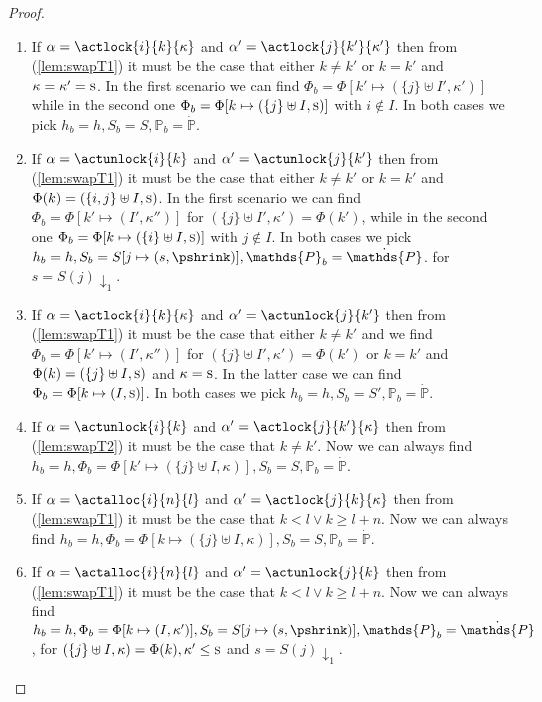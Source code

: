 \begin{lem}
\begin{proof}
\begin{enumerate}[label=({\roman*})]
		\item If $\alpha = \actlock{i}{k}{\kappa}$ and $\alpha' = \actlock{j}{k'}{\kappa'}$ then from (\ref{lem:swapT1}) it must be the case that either $k \neq k'$ or $k = k'$ and $\kappa = \kappa' = \textsc{s}$. In the first scenario we can find $\Phi_b = \Phi[k' \mapsto (\{j\} \uplus I', \kappa')]$ while in the second one $\Phi_b = \Phi[k \mapsto (\{j\} \uplus I, \textsc{s})]$ with $i \not\in I$. In both cases we pick $h_b = h, S_b = S, \mathds{P}_b = \dot{\mathds{P}}$.
		
		\item If $\alpha = \actunlock{i}{k}$ and $\alpha' = \actunlock{j}{k'}$ then from (\ref{lem:swapT1}) it must be the case that either $k \neq k'$ or $k = k'$ and $\Phi(k) = (\{i, j\} \uplus I, \textsc{s})$. In the first scenario we can find $\Phi_b = \Phi[k' \mapsto (I', \kappa'')]$ for $(\{j\} \uplus I', \kappa') = \Phi(k')$, while in the second one $\Phi_b = \Phi[k \mapsto (\{i\} \uplus I, \textsc{s})]$ with $j \not\in I$. In both cases we pick $h_b = h, S_b = S[j \mapsto (s, \pshrink)], \mathds{P}_b = \dot{\mathds{P}}$. for $s = S(j) \downarrow_1$.
		
		\item If $\alpha = \actlock{i}{k}{\kappa}$ and $\alpha' = \actunlock{j}{k'}$ then from (\ref{lem:swapT1}) it must be the case that either $k \neq k'$ and we find $\Phi_b = \Phi[k' \mapsto (I', \kappa'')]$ for $(\{j\} \uplus I', \kappa') = \Phi(k')$ or $k = k'$ and $\Phi(k) = (\{j\} \uplus I, \textsc{s})$ and $\kappa = \textsc{s}$. In the latter case we can find $\Phi_b = \Phi[k \mapsto (I, \textsc{s})]$. In both cases we pick $h_b = h, S_b = S', \mathds{P}_b = \dot{\mathds{P}}$.
		
		\item If $\alpha = \actunlock{i}{k}$ and $\alpha' = \actlock{j}{k'}{\kappa}$ then from (\ref{lem:swapT2}) it must be the case that $k \neq k'$. Now we can always find $h_b = h, \Phi_b = \Phi[k' \mapsto (\{j\} \uplus I, \kappa)], S_b = S, \mathds{P}_b = \dot{\mathds{P}}$.
		
		\item If $\alpha = \actalloc{i}{n}{l}$ and $\alpha' = \actlock{j}{k}{\kappa}$ then from (\ref{lem:swapT1}) it must be the case that $k < l \lor k \geq l + n$. Now we can always find $h_b = h, \Phi_b = \Phi[k \mapsto (\{j\} \uplus I, \kappa)], S_b = S, \mathds{P}_b = \dot{\mathds{P}}$.
		
		\item If $\alpha = \actalloc{i}{n}{l}$ and $\alpha' = \actunlock{j}{k}$ then from (\ref{lem:swapT1}) it must be the case that $k < l \lor k \geq l + n$. Now we can always find $h_b = h, \Phi_b = \Phi[k \mapsto (I, \kappa')], S_b = S[j \mapsto (s, \pshrink)], \mathds{P}_b = \dot{\mathds{P}}$, for $(\{j\} \uplus I, \kappa) = \Phi(k), \kappa' \leq \textsc{s}$ and $s = S(j) \downarrow_1$.
		

\end{enumerate}
\end{proof}
\end{lem}
